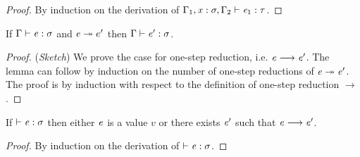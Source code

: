 \begin{proof}
    By induction on the derivation of $\Gamma_{{\mathrm{1}}}  ,  \mathit{x}  :  \sigma  ,  \Gamma_{{\mathrm{2}}}  \vdash  \mathit{e_{{\mathrm{1}}}}  :  \tau$.
\end{proof}

\begin{lem}\label{lem:ecore:reduct}
If $\Gamma  \vdash  \mathit{e}  :  \sigma$ and $\mathit{e}  \twoheadrightarrow  e'$ then $\Gamma  \vdash  \mathit{e'}  :  \sigma$.
\end{lem}

\begin{proof}
    (\emph{Sketch}) We prove the case for one-step reduction, i.e. $\mathit{e}  \longrightarrow  \mathit{e'}$. The lemma can follow by induction on the number of one-step reductions of $\mathit{e}  \twoheadrightarrow  \mathit{e'}$.
    The proof is by induction with respect to the definition of one-step reduction $ \longrightarrow $.
\end{proof}

\begin{lem}[Progress]\label{lem:ecore:prog}
If $\vdash  \mathit{e}  :  \sigma$ then either $\mathit{e}$ is a value $v$ or there exists $\mathit{e}'$ such that $\mathit{e}  \longrightarrow  \mathit{e'}$.
\end{lem}

\begin{proof}
    By induction on the derivation of $\vdash  \mathit{e}  :  \sigma$.
\end{proof}
